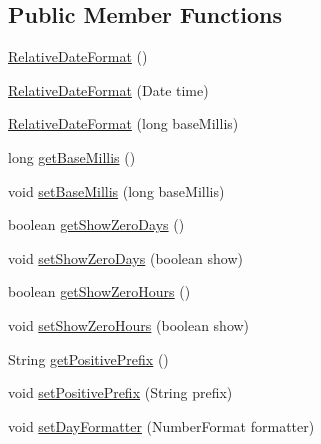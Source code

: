 \subsection*{Public Member Functions}
\begin{DoxyCompactItemize}
\item 
\mbox{\hyperlink{classorg_1_1jfree_1_1chart_1_1util_1_1_relative_date_format_acad18bb290f944a6c97f9b30b745054b}{Relative\+Date\+Format}} ()
\item 
\mbox{\hyperlink{classorg_1_1jfree_1_1chart_1_1util_1_1_relative_date_format_a8e8d4c71480ca2c2de170315cc1fd7ab}{Relative\+Date\+Format}} (Date time)
\item 
\mbox{\hyperlink{classorg_1_1jfree_1_1chart_1_1util_1_1_relative_date_format_a7f19f38d482002b08a75076c3e6524a4}{Relative\+Date\+Format}} (long base\+Millis)
\item 
long \mbox{\hyperlink{classorg_1_1jfree_1_1chart_1_1util_1_1_relative_date_format_a71ed7fdde18c1e20654263d000dfb5f8}{get\+Base\+Millis}} ()
\item 
void \mbox{\hyperlink{classorg_1_1jfree_1_1chart_1_1util_1_1_relative_date_format_a1f94b91f33e77bd00bf094e6c24f32db}{set\+Base\+Millis}} (long base\+Millis)
\item 
boolean \mbox{\hyperlink{classorg_1_1jfree_1_1chart_1_1util_1_1_relative_date_format_a0df68eae2abaeaad6a30f11c4581ef67}{get\+Show\+Zero\+Days}} ()
\item 
void \mbox{\hyperlink{classorg_1_1jfree_1_1chart_1_1util_1_1_relative_date_format_a04513ebddae696114b47f23d38fcd5f6}{set\+Show\+Zero\+Days}} (boolean show)
\item 
boolean \mbox{\hyperlink{classorg_1_1jfree_1_1chart_1_1util_1_1_relative_date_format_a0659489a2820c585ca1e30ea7f0f2768}{get\+Show\+Zero\+Hours}} ()
\item 
void \mbox{\hyperlink{classorg_1_1jfree_1_1chart_1_1util_1_1_relative_date_format_aac19e1c8e60280bae7a59223ac11aee2}{set\+Show\+Zero\+Hours}} (boolean show)
\item 
String \mbox{\hyperlink{classorg_1_1jfree_1_1chart_1_1util_1_1_relative_date_format_a10c531ab32ba29c56cd4d89869507be7}{get\+Positive\+Prefix}} ()
\item 
void \mbox{\hyperlink{classorg_1_1jfree_1_1chart_1_1util_1_1_relative_date_format_af8a2bab7d176504b80e06476e3c7850c}{set\+Positive\+Prefix}} (String prefix)
\item 
void \mbox{\hyperlink{classorg_1_1jfree_1_1chart_1_1util_1_1_relative_date_format_aa6256da01e4ef7f2568bd5bd6bd4ccc7}{set\+Day\+Formatter}} (Number\+Format formatter)

\end{DoxyCompactItemize}
